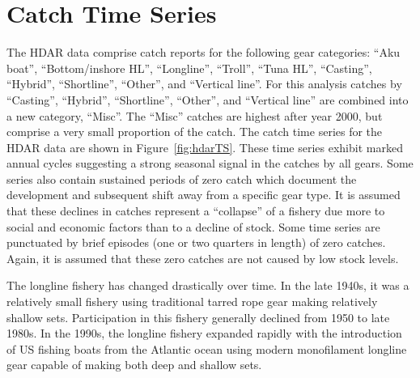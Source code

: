 \documentclass[12pt,letterpaper,twoside]{article}
\begin{document}
\section{Catch Time Series}
\label{sec:data}





The HDAR data comprise catch reports for the following gear
categories:
``Aku boat'', ``Bottom/inshore HL'', ``Longline'',  ``Troll'', ``Tuna
HL'', ``Casting'', ``Hybrid'',  ``Shortline'', ``Other'', and
``Vertical line''.
For this analysis catches by ``Casting'', ``Hybrid'',
``Shortline'', ``Other'', and ``Vertical line'' are combined into a new
category, ``Misc''. The ``Misc''
catches are highest after year 2000,
but comprise a very small proportion of the catch.
The catch time series for the HDAR data are shown in
Figure~\ref{fig:hdarTS}. These time
series exhibit marked annual cycles suggesting a strong seasonal
signal in the catches by all gears.
Some series also contain sustained periods of zero catch which
document the development and subsequent shift away from a specific
gear type. It is assumed that these declines in catches represent a
``collapse'' of a fishery due more to social and economic factors than
to a decline of stock.
Some time series are punctuated by brief episodes (one or two quarters in
length) of zero catches. Again, it is assumed that these zero catches
are not caused by low stock levels.

The longline fishery has changed drastically over time. In the late
1940s, it was a relatively small fishery using traditional
tarred rope gear making relatively shallow sets.
Participation in this fishery generally declined from 1950 to
late 1980s. In the 1990s, the longline
fishery expanded rapidly with the introduction of US fishing boats
from the Atlantic ocean using modern monofilament longline gear
capable of making both deep and shallow sets.
\end{document}
